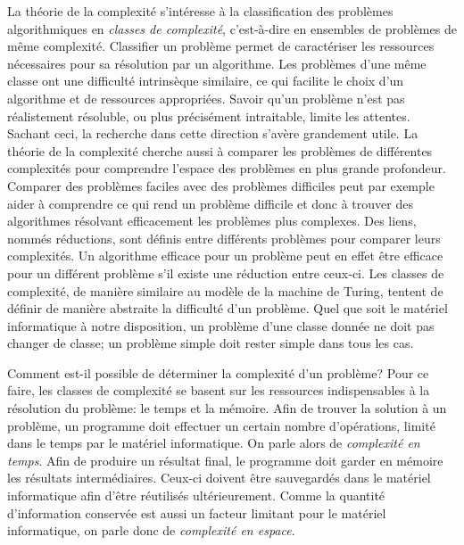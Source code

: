 La théorie de la complexité s'intéresse à la classification des problèmes algorithmiques en \textit{classes de complexité}, c'est-à-dire en ensembles de problèmes de même complexité. Classifier un problème permet de caractériser les ressources nécessaires pour sa résolution par un algorithme. Les problèmes d'une même classe ont une difficulté intrinsèque similaire, ce qui facilite le choix d'un algorithme et de ressources appropriées. Savoir qu'un problème n'est pas réalistement résoluble, ou plus précisément intraitable, limite les attentes. Sachant ceci, la recherche dans cette direction s'avère grandement utile. La théorie de la complexité cherche aussi à comparer les problèmes de différentes complexités pour comprendre l'espace des problèmes en plus grande profondeur. Comparer des problèmes faciles avec des problèmes difficiles peut par exemple aider à comprendre ce qui rend un problème difficile et donc à trouver des algorithmes résolvant efficacement les problèmes plus complexes. Des liens, nommés réductions, sont définis entre différents problèmes pour comparer leurs complexités. Un algorithme efficace pour un problème peut en effet être efficace pour un différent problème s'il existe une réduction entre ceux-ci. Les classes de complexité, de manière similaire au modèle de la machine de Turing, tentent de définir de manière abstraite la difficulté d'un problème. Quel que soit le matériel informatique à notre disposition, un problème d'une classe donnée ne doit pas changer de classe; un problème simple doit rester simple dans tous les cas.

Comment est-il possible de déterminer la complexité d'un problème? Pour ce faire, les classes de complexité se basent sur les ressources indispensables à la résolution du problème: le temps et la mémoire. Afin de trouver la solution à un problème, un programme doit effectuer un certain nombre d'opérations, limité dans le temps par le matériel informatique. On parle alors de \textit{complexité en temps}. Afin de produire un résultat final, le programme doit garder en mémoire les résultats intermédiaires. Ceux-ci doivent être sauvegardés dans le matériel informatique afin d'être réutilisés ultérieurement. Comme la quantité d'information conservée est aussi un facteur limitant pour le matériel informatique, on parle donc de \textit{complexité en espace}. 

